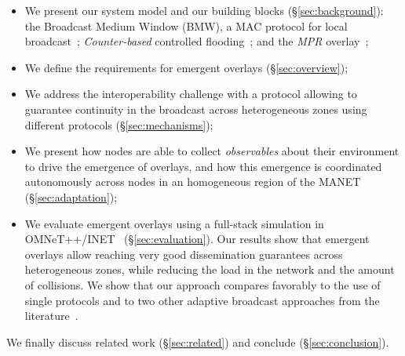 \begin{itemize}
	\item We present our system model and our building blocks (\S\ref{sec:background}): the Broadcast Medium Window (BMW), a MAC protocol for local broadcast~\citep{tang2001mac}; \emph{Counter-based} controlled flooding~\citep{2001:AAR:876878.879323}; and the \emph{MPR} overlay~\citep{mpr};
	\item We define the requirements for emergent overlays (\S\ref{sec:overview});
	\item We address the interoperability challenge with a protocol allowing to guarantee continuity in the broadcast across heterogeneous zones using different protocols (\S\ref{sec:mechanisms});
	\item We present how nodes are able to collect \emph{observables} about their environment to drive the emergence of overlays, and how this emergence is coordinated autonomously across nodes in an homogeneous region of the MANET (\S\ref{sec:adaptation});
	\item We evaluate emergent overlays using a full-stack simulation in OMNeT++/INET~\citep{omnet} (\S\ref{sec:evaluation}).
	Our results show that emergent overlays allow reaching very good dissemination guarantees across heterogeneous zones, while reducing the load in the network and the amount of collisions.
	We show that our approach compares favorably to the use of single protocols and to two other adaptive broadcast approaches from the literature~\citep{2001:AAR:876878.879323,adaptive_group_com_iscc02}.
\end{itemize}
We finally discuss related work (\S\ref{sec:related}) and conclude (\S\ref{sec:conclusion}).
